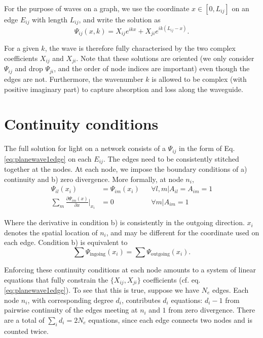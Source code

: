 For the purpose of waves on a graph, we use the coordinate $x \in [0, L_{ij}]$ on an edge $E_{ij}$ with length $L_{ij}$, and write the solution as
\begin{equation}
    \label{eq:planewave1edge}
    \Psi_{ij}(x,k) = X_{ij}e^{ikx} + X_{ji}e^{ik(L_{ij}-x)}.
\end{equation}

For a given $k$, the wave is therefore fully characterised by the two complex coefficients $X_{ij}$ and $X_{ji}$. Note that these solutions are oriented (we only consider $\Psi_{ij}$ and drop $\Psi_{ji}$, and the order of node indices are important) even though the edges are not. Furthermore, the wavenumber $k$ is allowed to be complex (with positive imaginary part) to capture absorption and loss along the waveguide.


\section{Continuity conditions}
The full solution for light on a network consists of a $\Psi_{ij}$ in the form of Eq.\ref{eq:planewave1edge} on each $E_{ij}$. The edges need to be consistently stitched together at the nodes. At each node, we impose the boundary conditions of a) continuity and b) zero divergence. More formally, at node $n_i$,
\begin{subequations}
\begin{align}
\label{eq:cont.cond}
        \Psi_{il} (x_i) &= \Psi_{im}(x_i) &&\forall l,m \rvert A_{il}=A_{im}=1\\
        \sum_m \frac{\partial\Psi_{im}(x)}{\partial x}\Big\rvert_{x_i} &= 0 &&\forall m \rvert A_{im}=1 
\end{align}
\end{subequations}

Where the derivative in condition b) is consistently in the outgoing direction. $x_i$ denotes the spatial location of $n_i$, and may be different for the coordinate used on each edge. Condition b) is equivalent to 
\begin{equation}
    \label{eq:in=out}
    \sum \Psi_{\textrm{ingoing}} (x_i) = \sum \Psi_{\textrm{outgoing}} (x_i).
\end{equation}

Enforcing these continuity conditions at each node amounts to a system of linear equations that fully constrain the $\{X_{ij},X_{ji}\}$ coefficients (cf. eq.\ref{eq:planewave1edge}). To see that this is true, suppose we have $N_e$ edges. Each node $n_i$, with corresponding degree $d_i$, contributes $d_i$ equations: $d_i - 1$ from pairwise continuity of the edges meeting at $n_i$ and $1$ from zero divergence. There are a total of $\sum_i{d_i} = 2N_e$ equations, since each edge connects two nodes and is counted twice.


